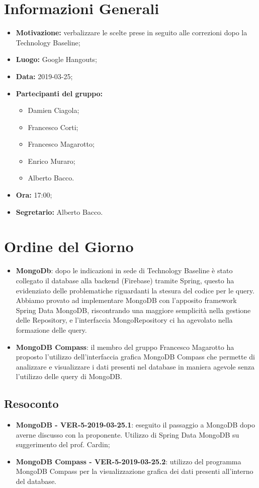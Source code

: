 \documentclass[a4paper, oneside, openany, dvipsnames, table]{article}
\begin{document}
\copertina{}


\newpage
\tableofcontents
\newpage
\section{Informazioni Generali}
\begin{itemize}
\item \textbf{Motivazione:} verbalizzare le scelte prese in seguito alle correzioni dopo la Technology Baseline;
\item \textbf{Luogo:} Google Hangouts;
\item \textbf{Data:} 2019-03-25;
\item \textbf{Partecipanti del gruppo:} \hfill
	\begin{itemize}
		\item Damien Ciagola;
		\item Francesco Corti;
		\item Francesco Magarotto;
		\item Enrico Muraro;
		\item Alberto Bacco.
	\end{itemize} 
\item \textbf{Ora:} 17:00;
\item \textbf{Segretario:} Alberto Bacco.
\end{itemize}

\section{Ordine del Giorno}
\begin{itemize}
	\item \textbf{MongoDb}: 
	dopo le indicazioni in sede di Technology Baseline è stato 
	collegato il database alla backend (Firebase) tramite Spring, questo ha evidenziato delle problematiche riguardanti la stesura
	del codice per le query. 
	Abbiamo provato ad implementare MongoDB con l'apposito framework Spring Data MongoDB, riscontrando
	una maggiore semplicità nella gestione delle Repository, e
	l'interfaccia MongoRepository ci ha agevolato nella 
	formazione delle query.
	\item \textbf{MongoDB Compass}: il membro del gruppo Francesco Magarotto ha proposto l'utilizzo dell'interfaccia grafica MongoDB Compass che permette di analizzare e visualizzare  i dati presenti nel database in maniera agevole senza l'utilizzo delle query di MongoDB. 
\end{itemize}

\subsection{Resoconto}
\begin{itemize}
	\item \textbf{MongoDB - VER-5-2019-03-25.1}: 
	eseguito il passaggio a MongoDB dopo averne discusso con la 
	proponente. Utilizzo di Spring Data MongoDB su suggerimento del prof. Cardin;
	\item \textbf{MongoDB Compass - VER-5-2019-03-25.2}:
	utilizzo del programma MongoDB Compass per la visualizzazione grafica dei dati presenti all'interno del database.
	
	
\end{itemize}
\end{document}
